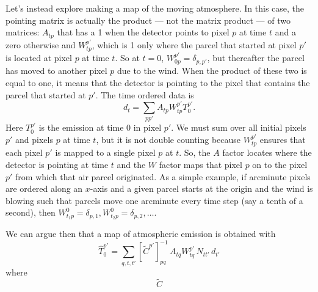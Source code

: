 \documentclass[12pt]{article}
\newcommand\be{\begin{equation}}
\newcommand\ee{\end{equation}}
\begin{document}
Let's instead explore making a map of the moving atmosphere. In this case, the pointing matrix is actually the product --- not the matrix product --- of two matrices: $A_{tp}$ that has a 1 when the detector points to pixel $p$ at time $t$ and a zero otherwise and $W^{p'}_{tp}$, which is 1 only where the parcel that started at pixel $p'$ is located at pixel $p$ at time $t$. So at $t=0$, $W^{p'}_{0p}=\delta_{p,p'}$, but thereafter the parcel has moved to another pixel $p$ due to the wind. When the product of these two is equal to one, it means that the detector is pointing to the pixel that contains the parcel that started at $p'$. 
The time ordered data is
\be
d_t = \sum_{pp'} A_{tp} W^{p'}_{tp}T^{p'}_0.\ee
Here $T^{p'}_0$ is the emission at time 0 in pixel $p'$. We must sum over all initial pixels $p'$ and pixels $p$ at time $t$, but it is not double counting because $W^{p'}_{tp}$ ensures that each pixel $p'$ is mapped to a single pixel $p$ at $t$. So, the $A$ factor locates where the detector is pointing at time $t$ and the $W$ factor maps that pixel $p$ on to the pixel $p'$ from which that air parcel originated. As a simple example, if arcminute pixels are ordered along an $x$-axis and a given parcel starts at the origin and the wind is blowing such that parcels move one arcminute every time step (say a tenth of a second), then $W^{0}_{t_1p}=\delta_{p,1}, W^{0}_{t_2p}=\delta_{p,2},\ldots$. 

We can argue then that a map of atmospheric emission is obtained with
\be
\hat T_0^{p'} = \sum_{q,t,t'} \left[ \tilde C^{p'}\right]^{-1}_{pq}\, A_{tq} W^{p'}_{tq} \, N_{tt'}\, d_{t'} \ee
where
\be
\tilde C
\ee
\end{document}
